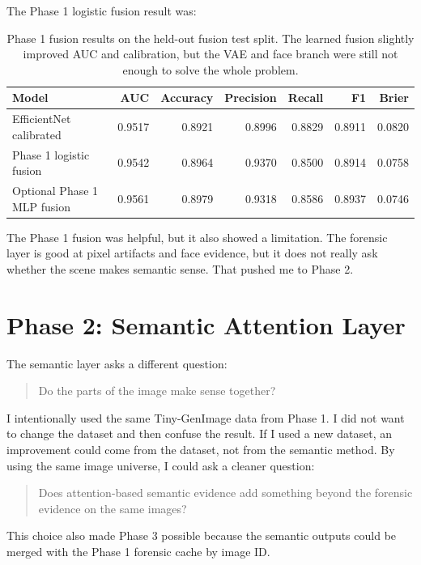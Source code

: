\documentclass[11pt]{article}
\begin{document}
The Phase 1 logistic fusion result was:

\begin{table}[H]
\centering
\begin{tabular}{lrrrrrr}
\toprule
Model & AUC & Accuracy & Precision & Recall & F1 & Brier \\
\midrule
EfficientNet calibrated & 0.9517 & 0.8921 & 0.8996 & 0.8829 & 0.8911 & 0.0820 \\
Phase 1 logistic fusion & 0.9542 & 0.8964 & 0.9370 & 0.8500 & 0.8914 & 0.0758 \\
Optional Phase 1 MLP fusion & 0.9561 & 0.8979 & 0.9318 & 0.8586 & 0.8937 & 0.0746 \\
\bottomrule
\end{tabular}
\caption{Phase 1 fusion results on the held-out fusion test split. The learned fusion slightly improved AUC and calibration, but the VAE and face branch were still not enough to solve the whole problem.}
\label{tab:phase1-fusion}
\end{table}

The Phase 1 fusion was helpful, but it also showed a limitation. The forensic layer is good at pixel artifacts and face evidence, but it does not really ask whether the scene makes semantic sense. That pushed me to Phase 2.

\section{Phase 2: Semantic Attention Layer}

The semantic layer asks a different question:

\begin{quote}
Do the parts of the image make sense together?
\end{quote}

I intentionally used the same Tiny-GenImage data from Phase 1. I did not want to change the dataset and then confuse the result. If I used a new dataset, an improvement could come from the dataset, not from the semantic method. By using the same image universe, I could ask a cleaner question:

\begin{quote}
Does attention-based semantic evidence add something beyond the forensic evidence on the same images?
\end{quote}

This choice also made Phase 3 possible because the semantic outputs could be merged with the Phase 1 forensic cache by image ID.
\end{document}
